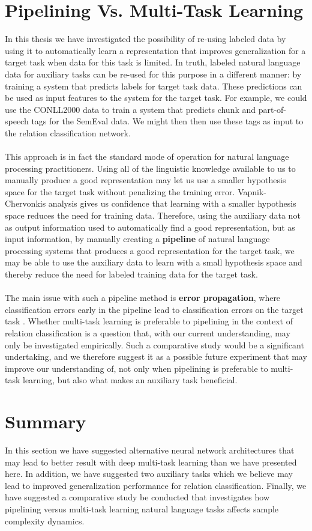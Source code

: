 \section{Pipelining Vs. Multi-Task Learning}
In this thesis we have investigated the possibility of re-using labeled data by using it to automatically learn a representation that improves generalization for a target task when data for this task is limited. In truth, labeled natural language data for auxiliary tasks can be re-used for this purpose in a different manner: by training a system that predicts labels for target task data. These predictions can be used as input features to the system for the target task. For example, we could use the CONLL2000 data to train a system that predicts chunk and part-of-speech tags for the SemEval data. We might then then use these tags as input to the relation classification network.
\\\\
This approach is in fact the standard mode of operation for natural language processing practitioners. Using all of the linguistic knowledge available to us to manually produce a good representation may let us use a smaller hypothesis space for the target task without penalizing the training error. Vapnik-Chervonkis analysis gives us confidence that learning with a smaller hypothesis space reduces the need for training data. Therefore, using the auxiliary data not as output information used to automatically find a good representation, but as input information, by manually creating a \textbf{pipeline} of natural language processing systems that produces a good representation for the target task, we may be able to use the auxiliary data to learn with a small hypothesis space and thereby reduce the need for labeled training data for the target task.
\\\\
The main issue with such a pipeline method is \textbf{error propagation}, where classification errors early in the pipeline lead to classification errors on the target task \citep{collobert2011}. Whether multi-task learning is preferable to pipelining in the context of relation classification is a question that, with our current understanding, may only be investigated empirically. Such a comparative study would be a significant undertaking, and we therefore suggest it as a possible future experiment that may improve our understanding of, not only when pipelining is preferable to multi-task learning, but also what makes an auxiliary task beneficial.

\section{Summary}
In this section we have suggested alternative neural network architectures that may lead to better result with deep multi-task learning than we have presented here. In addition, we have suggested two auxiliary tasks which we believe may lead to improved generalization performance for relation classification. Finally, we have suggested a comparative study be conducted that investigates how pipelining versus multi-task learning natural language tasks affects sample complexity dynamics.
